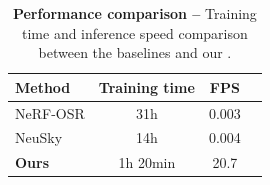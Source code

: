 
\begin{table}[t]
  \centering
  \begin{tabular}{lccc}
    \toprule
    \textbf{Method}                   & \textbf{Training time} & \textbf{FPS} \\
    \midrule
    NeRF-OSR \cite{rudnev2022nerfosr} & 31h                    & 0.003        \\
    NeuSky \cite{gardner2023neusky}   & 14h                    & 0.004        \\
    \textbf{Ours}                     & 1h 20min               & 20.7         \\
    \bottomrule
  \end{tabular}
  \caption[Training and inference times of \lumigauss compared to other approaches]{\textbf{Performance comparison --}
    Training time and inference speed comparison between the baselines and our
    \lumigauss.
  }
  \label{tab:lumigauss-performance}
\end{table}

